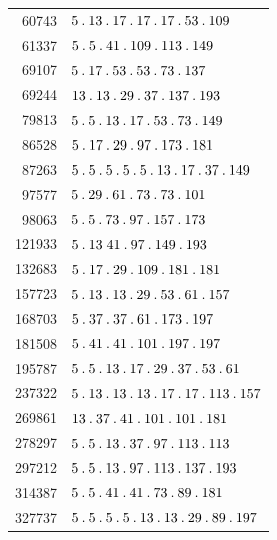\begin{longtable}{@{}r|l@{}}
60743 & $5\pdot 13\pdot 17\pdot 17\pdot 17\pdot 53\pdot 109$\\
61337 & $5\pdot 5\pdot 41\pdot 109\pdot 113\pdot 149$\\
69107 & $5\pdot 17\pdot 53\pdot 53\pdot 73\pdot 137$\\
69244 & $13\pdot 13\pdot 29\pdot 37\pdot 137\pdot 193$\\
79813 & $5\pdot 5\pdot 13\pdot 17\pdot 53\pdot 73\pdot 149$\\
86528 & $5\pdot 17\pdot 29\pdot 97\pdot 173\pdot 181$\\
87263 & $5\pdot 5\pdot 5\pdot 5\pdot 5\pdot 13\pdot 17\pdot 37\pdot 149$\\
97577 & $5\pdot 29\pdot 61\pdot 73\pdot 73\pdot 101$\\
98063 & $5\pdot 5\pdot 73\pdot 97\pdot 157\pdot 173$\\
121933 & $5\pdot 13\;41\pdot 97\pdot 149\pdot 193$\\
132683 & $5\pdot 17\pdot 29\pdot 109\pdot 181\pdot 181$\\
157723 & $5\pdot 13\pdot 13\pdot 29\pdot 53\pdot 61\pdot 157$\\
168703 & $5\pdot 37\pdot 37\pdot 61\pdot 173\pdot 197$\\
181508 & $5\pdot 41\pdot 41\pdot 101\pdot 197\pdot 197$\\
195787 & $5\pdot 5\pdot 13\pdot 17\pdot 29\pdot 37\pdot 53\pdot 61$\\
237322 & $5\pdot 13\pdot 13\pdot 13\pdot 17\pdot 17\pdot 113\pdot 157$\\
269861 & $13\pdot 37\pdot 41\pdot 101\pdot 101\pdot 181$\\
278297 & $5\pdot 5\pdot 13\pdot 37\pdot 97\pdot 113\pdot 113$\\
297212 & $5\pdot 5\pdot 13\pdot 97\pdot 113\pdot 137\pdot 193$\\
314387 & $5\pdot 5\pdot 41\pdot 41\pdot 73\pdot 89\pdot 181$\\
327737 & $5\pdot 5\pdot 5\pdot 5\pdot 13\pdot 13\pdot 29\pdot 89\pdot 197$\\
\end{longtable}\endgroup
